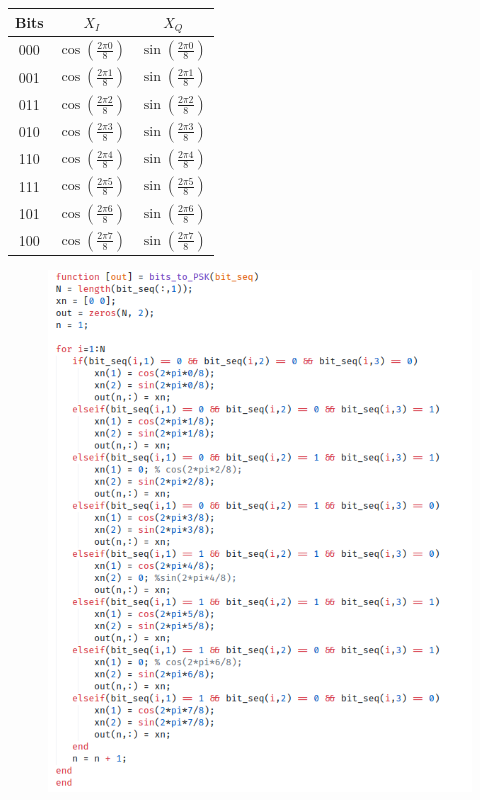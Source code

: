 \documentclass[12pt, a4paper]{article}
\begin{document}
\begin{enumerate}
\begin{enumerate}
            \begin{center}
                \begin{tabular}{ | c | c | c | } 
                    \hline
                    Bits & \(X_I\) & \(X_Q\) \\ 
                    \hline
                    000 & \(\cos(\frac{2\pi0}{8})\) & \(\sin(\frac{2\pi0}{8})\) \\ 
                    \hline
                    001 & \(\cos(\frac{2\pi1}{8})\) & \(\sin(\frac{2\pi1}{8})\) \\ 
                    \hline
                    011 & \(\cos(\frac{2\pi2}{8})\) & \(\sin(\frac{2\pi2}{8})\) \\ 
                    \hline
                    010 & \(\cos(\frac{2\pi3}{8})\) & \(\sin(\frac{2\pi3}{8})\) \\ 
                    \hline
                    110 & \(\cos(\frac{2\pi4}{8})\) & \(\sin(\frac{2\pi4}{8})\) \\ 
                    \hline
                    111 & \(\cos(\frac{2\pi5}{8})\) & \(\sin(\frac{2\pi5}{8})\) \\ 
                    \hline
                    101 & \(\cos(\frac{2\pi6}{8})\) & \(\sin(\frac{2\pi6}{8})\) \\ 
                    \hline
                    100 & \(\cos(\frac{2\pi7}{8})\) & \(\sin(\frac{2\pi7}{8})\) \\ 
                    \hline
                \end{tabular}
            \end{center}  
            \begin{figure}[H]
                \centering
                \includegraphics[scale=1]{bit2psk.png}

\end{figure}
\end{enumerate}
\end{enumerate}
\end{document}

